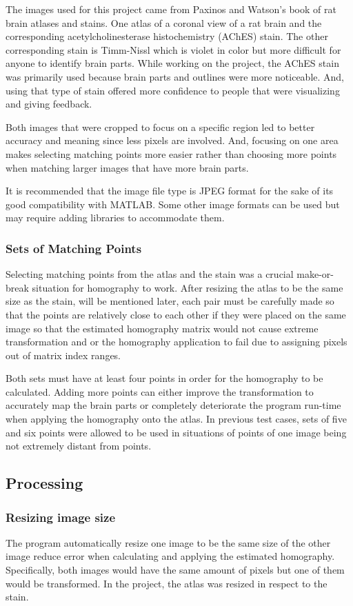 \documentclass[10pt,twocolumn]{article}
\begin{document}
The images used for this project came from Paxinos and Watson's book of rat brain atlases and stains. One atlas of a coronal view of a rat brain and the corresponding acetylcholinesterase histochemistry (AChES) stain. The other corresponding stain is Timm-Nissl which is violet in color but more difficult for anyone to identify brain parts. While working on the project, the AChES stain was primarily used because brain parts and outlines were more noticeable. And, using that type of stain offered more confidence to people that were visualizing and giving feedback. 

Both images that were cropped to focus on a specific region led to better accuracy and meaning since less pixels are involved. And, focusing on one area makes selecting matching points more easier rather than choosing more points when matching larger images that have more brain parts.  

It is recommended that the image file type is JPEG format for the sake of its good compatibility with MATLAB. Some other image formats can be used but may require adding libraries to accommodate them. 

\subsubsection{Sets of Matching Points}
Selecting matching points from the atlas and the stain was a crucial make-or-break situation for homography to work. After resizing the atlas to be the same size as the stain, will be mentioned later, each pair must be carefully made so that the points are relatively close to each other if they were placed on the same image so that the estimated homography matrix would not cause extreme transformation and or the homography application to fail due to assigning pixels out of matrix index ranges. 

Both sets must have at least four points in order for the homography to be calculated. Adding more points can either improve the transformation to accurately map the brain parts or completely deteriorate the program run-time when applying the homography onto the atlas. In previous test cases, sets of five and six points were allowed to be used in situations of points of one image being not extremely distant from points. 

\subsection{Processing}
\subsubsection{Resizing image size}
The program automatically resize one image to be the same size of the other image reduce error when calculating and applying the estimated homography. Specifically, both images would have the same amount of pixels but one of them would be transformed. In the project, the atlas was resized in respect to the stain. 
\end{document}
